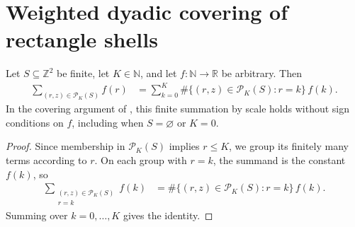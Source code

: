 \section{Weighted dyadic covering of rectangle shells}

\begin{lemma}
    \label{thm:area_law_capped_sum_by_scale}
    \leanok
    Let $S\subseteq\mathbb Z^2$ be finite, let $K\in\mathbb N$, and let
    $f:\mathbb N\to\mathbb R$ be arbitrary. Then
    \begin{align}
        \sum_{(r,z)\in\mathcal P_K(S)} f(r)
         & =\sum_{k=0}^{K}
        \#\{(r,z)\in\mathcal P_K(S):r=k\}\,f(k).
    \end{align}
    In the covering argument of
    \cite[Lemma~9.4, lines~656--664]{OpenAI2026AreaLaw}, this finite summation
    by scale holds without sign conditions on $f$, including when
    $S=\varnothing$ or $K=0$.
\end{lemma}
\begin{proof}
    \leanok
    Since membership in $\mathcal P_K(S)$ implies $r\le K$, we group its
    finitely many terms according to $r$. On each group with $r=k$, the summand is
    the constant $f(k)$, so
    \begin{align}
        \sum_{\substack{(r,z)\in\mathcal P_K(S)      \\r=k}}f(k)
         & =\#\{(r,z)\in\mathcal P_K(S):r=k\}\,f(k).
    \end{align}
    Summing over $k=0,\ldots,K$ gives the identity.
\end{proof}

